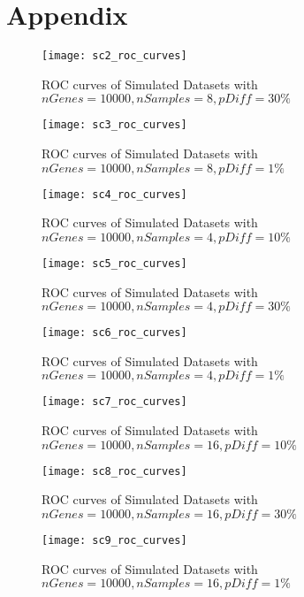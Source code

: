 \section{Appendix}

\begin{figure}[h!tb] 
\texttt{[image: sc2\_roc\_curves]}
\caption{ROC curves of Simulated Datasets with $nGenes=10000, nSamples=8, pDiff=30\%$}
\label{sc2_roc}
\end{figure}

\begin{figure}[h!tb] 
\texttt{[image: sc3\_roc\_curves]}
\caption{ROC curves of Simulated Datasets with $nGenes=10000, nSamples=8, pDiff=1\%$}
\label{sc3_roc}
\end{figure}


\begin{figure}[h!tb] 
\texttt{[image: sc4\_roc\_curves]}
\caption{ROC curves of Simulated Datasets with $nGenes=10000, nSamples=4, pDiff=10\%$}
\label{sc4_roc}
\end{figure}


\begin{figure}[h!tb] 
\texttt{[image: sc5\_roc\_curves]}
\caption{ROC curves of Simulated Datasets with $nGenes=10000, nSamples=4, pDiff=30\%$}
\label{sc5_roc}
\end{figure}


\begin{figure}[h!tb] 
\texttt{[image: sc6\_roc\_curves]}
\caption{ROC curves of Simulated Datasets with $nGenes=10000, nSamples=4, pDiff=1\%$}
\label{sc6_roc}
\end{figure}

\begin{figure}[h!tb] 
\texttt{[image: sc7\_roc\_curves]}
\caption{ROC curves of Simulated Datasets with $nGenes=10000, nSamples=16, pDiff=10\%$}
\label{sc7_roc}
\end{figure}

\begin{figure}[h!tb] 
\texttt{[image: sc8\_roc\_curves]}
\caption{ROC curves of Simulated Datasets with $nGenes=10000, nSamples=16, pDiff=30\%$}
\label{sc8_roc}
\end{figure}

\begin{figure}[h!tb] 
\texttt{[image: sc9\_roc\_curves]}
\caption{ROC curves of Simulated Datasets with $nGenes=10000, nSamples=16, pDiff=1\%$}
\label{sc9_roc}
\end{figure}


